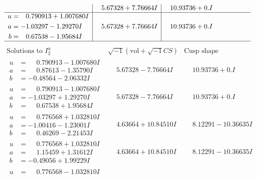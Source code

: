 \documentclass[1p]{elsarticle_modified}
\theoremstyle{definition}
\newcommand{\I}{\sqrt{-1}}
\begin{document}
$$\begin{array}{c|c|c}
 & \phantom{-}5.67328 + 7.76664 I & \phantom{-}10.93736 + 0. I\phantom{ +0.000000I} \\ \hline\begin{aligned}
u &= \phantom{-}0.790913 + 1.007680 I \\
a &= -1.03297 - 1.29270 I \\
b &= \phantom{-}0.67538 - 1.95684 I\end{aligned}
 & \phantom{-}5.67328 + 7.76664 I & \phantom{-}10.93736 + 0. I\phantom{ +0.000000I}\\
 \hline 
 \end{array}$$\newpage$$\begin{array}{c|c|c}  
\text{Solutions to }I^u_{2}& \I (\text{vol} + \sqrt{-1}CS) & \text{Cusp shape}\\
 \hline 
\begin{aligned}
u &= \phantom{-}0.790913 - 1.007680 I \\
a &= \phantom{-}0.87613 - 1.35790 I \\
b &= -0.48564 - 2.06332 I\end{aligned}
 & \phantom{-}5.67328 - 7.76664 I & \phantom{-}10.93736 + 0. I\phantom{ +0.000000I} \\ \hline\begin{aligned}
u &= \phantom{-}0.790913 - 1.007680 I \\
a &= -1.03297 + 1.29270 I \\
b &= \phantom{-}0.67538 + 1.95684 I\end{aligned}
 & \phantom{-}5.67328 - 7.76664 I & \phantom{-}10.93736 + 0. I\phantom{ +0.000000I} \\ \hline\begin{aligned}
u &= \phantom{-}0.776568 + 1.032810 I \\
a &= -1.00416 - 1.23001 I \\
b &= \phantom{-}0.46269 - 2.21453 I\end{aligned}
 & \phantom{-}4.63664 + 10.84510 I & \phantom{-}8.12291 - 10.36635 I \\ \hline\begin{aligned}
u &= \phantom{-}0.776568 + 1.032810 I \\
a &= \phantom{-}1.15459 + 1.31612 I \\
b &= -0.49056 + 1.99229 I\end{aligned}
 & \phantom{-}4.63664 + 10.84510 I & \phantom{-}8.12291 - 10.36635 I \\ \hline\begin{aligned}
u &= \phantom{-}0.776568 - 1.032810 I \\

\end{aligned}
\end{array}$$
\end{document}
